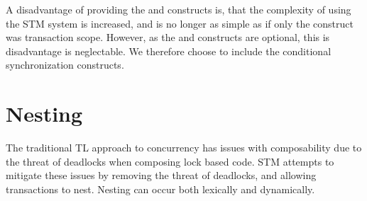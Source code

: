 A disadvantage of providing the  and  constructs is, that the complexity of using the \ac{STM} system is increased, and is no longer as simple as if only the construct was  transaction scope. However, as the  and  constructs are optional, this is disadvantage is neglectable. We therefore choose to include the conditional synchronization constructs.

\section{Nesting}
\label{sec:stm_req_nesting}
The traditional \acl{TL} approach to concurrency has issues with composability due to the threat of deadlocks\cite[p. 58]{sutter2005software} when composing lock based code. \ac{STM} attempts to mitigate these issues by removing the threat of deadlocks, and allowing transactions to nest. Nesting can occur both lexically and dynamically\cite[p. 1]{kumar2011hparstm}\cite[p. 42]{harris2010transactional}\cite[p. 2081]{herlihy2011tm}. 

%
%
%       
%
%
%       

